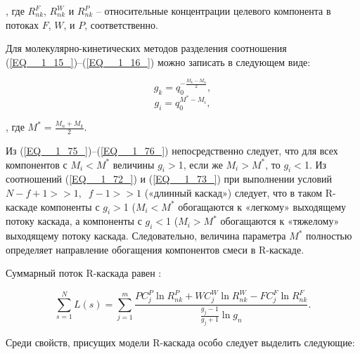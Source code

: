 , где $R_{n k}^{F}$, $R_{n k}^{W}$ и $R_{n k}^{P}$ -- относительные концентрации целевого компонента в потоках $F$, $W$, и $P$, соответственно.

Для молекулярно-кинетических методов разделения соотношения (\ref{EQ__1_15_})--(\ref{EQ__1_16_}) можно записать в следующем виде:

\begin{equation} \label{EQ__1_75_} 
  g_{k} =q_{0}^{-\frac{M_{k} -M_{n} }{2} } ,        
  \end{equation} 
  \begin{equation} \label{EQ__1_76_} 
  g_{i} =q_{0}^{M^{*} -M_{i} } ,        
\end{equation} 

, где $M^{*} =\frac{M_{n} +M_{k} }{2} $.

Из (\ref{EQ__1_75_})--(\ref{EQ__1_76_}) непосредственно следует, что для всех компонентов с $M_{i} $$\mathrm{<}$$M^{*} $ величины $g_{i} $$\mathrm{>}$1, если же $M_{i} $$\mathrm{>}$$M^{*} $, то $g_{i} $$\mathrm{<}$1. Из соотношений (\ref{EQ__1_72_}) и (\ref{EQ__1_73_}) при выполнении условий $N-f+1>>1,\; \; f-1>>1$ («длинный каскад») следует, что в таком R-каскаде компоненты с $g_{i} $$\mathrm{>}$1 ($M_{i} $$\mathrm{<}$$M^{*} $ обогащаются к «легкому» выходящему потоку каскада, а компоненты с $g_{i} $$\mathrm{<}$1 ($M_{i} $$\mathrm{>}$$M^{*}$ обогащаются к «тяжелому» выходящему потоку каскада. Следовательно, величина параметра $M^{*}$ полностью определяет направление обогащения компонентов смеси в R-каскаде. 

Суммарный поток R-каскада равен \cite{sulaberidzeTeoriyaKaskadovDlya2011}:

\begin{equation} \label{EQ__1_77_} 
  \sum _{s=1}^{N}L(s) =\sum _{j=1}^{m}\frac{PC_{j}^{P} \ln R_{nk}^{P} +WC_{j}^{W} \ln R_{nk}^{W} -FC_{j}^{F} \ln R_{nk}^{F} }{\frac{g_{j} -1}{g_{j} +1} \ln g_{n} }  .               
\end{equation} 

Среди свойств, присущих модели R-каскада особо следует выделить следующие:

